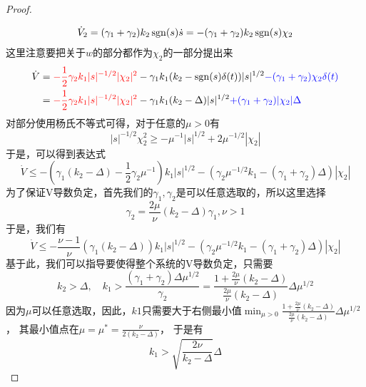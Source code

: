 \begin{proof}
\begin{align*}
	\end{align*}
	\begin{align*}
		\dot{V}_2=(\gamma_1+\gamma_2)k_2  \mathop{\mathrm{sgn}} (s)\dot{s}
		=-(\gamma_1+\gamma_2)k_2  \mathop{\mathrm{sgn}} (s)\chi_2
	\end{align*}
	这里注意要把关于$w$的部分都作为$\chi_2$的一部分提出来
	\begin{align*}
		\dot{V}
		&=\textcolor{red}{-\frac12 \gamma_2 k_1 |s|^{-1/2} |\chi_2|^2}
		-\gamma_1 k_1 (k_2-\mathop{\mathrm{sgn}} (s) \delta(t))|s|^{1/2}
		\textcolor{blue}{-(\gamma_1+\gamma_2)\chi_2 \delta(t)}
		\\
		&=\textcolor{red}{-\frac12 \gamma_2 k_1 |s|^{-1/2} |\chi_2|^2}
		-\gamma_1 k_1 (k_2-\Delta)|s|^{1/2}
		\textcolor{blue}{+(\gamma_1+\gamma_2)|\chi_2| \Delta}
	\end{align*}
	对部分使用杨氏不等式可得，对于任意的$\mu>0$有
	\begin{equation}
		|s|^{-1/2}\chi_2^2\geq 
		-\mu^{-1}|s|^{1/2}
		+2{\mu^{-1/2}}|\chi_2|
	\end{equation}
	于是，可以得到表达式
	\begin{equation}
		\dot{V}\leq 
		-\left(
			\gamma_1 (k_2-\Delta)-\frac12 \gamma_2 \mu^{-1}
		\right)
		k_1 |s|^{1/2}
		-\left( \gamma_2 \mu^{-1/2}k_1-(\gamma_1+\gamma_2)\Delta\right)
		|\chi_2|
	\end{equation}
	为了保证V导数负定，首先我们的$\gamma_1,\gamma_2$是可以任意选取的，所以这里选择
	\begin{equation*}
		\gamma_2=\frac{2\mu}{\nu }(k_2 -\Delta) \gamma_1,\nu>1
	\end{equation*}
	于是，我们有
	\begin{equation}
		\dot{V}\leq 
		-\frac{\nu-1}{\nu}\left(\gamma_1 (k_2-\Delta)\right)
		k_1 |s|^{1/2}
		-\left( \gamma_2 \mu^{-1/2}k_1-(\gamma_1+\gamma_2)\Delta\right)
		|\chi_2|
	\end{equation}
	基于此，我们可以指导要使得整个系统的V导数负定，只需要
	\begin{equation}
		k_2>\Delta,\quad 
		k_1>\frac{(\gamma_1+\gamma_2)\Delta\mu^{1/2}}{\gamma_2}
		=\frac{1+\frac{2\mu}{\nu }(k_2 -\Delta) }{\frac{2\mu}{\nu }(k_2 -\Delta) }\Delta \mu^{1/2}
	\end{equation}
	因为$\mu$可以任意选取，因此，$k1$只需要大于右侧最小值$\min_{\mu>0} \frac{1+\frac{2\mu}{\nu }(k_2 -\Delta) }{\frac{2\mu}{\nu }(k_2 -\Delta) }\Delta \mu^{1/2}$，
	其最小值点在$\mu=\mu^*=\frac{\nu}{2(k_2-\Delta)}$，
	于是有
	\begin{equation}
		k_1> \sqrt{\frac{2\nu}{k_2 -\Delta}}\Delta
	\end{equation}
	

\end{proof}
